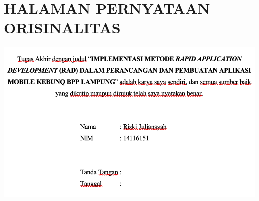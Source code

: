 %

\chapter*{\uppercase{HALAMAN PERNYATAAN ORISINALITAS}}
\centering
\includegraphics[width=14cm]{images/orisinal.png}\\
        




